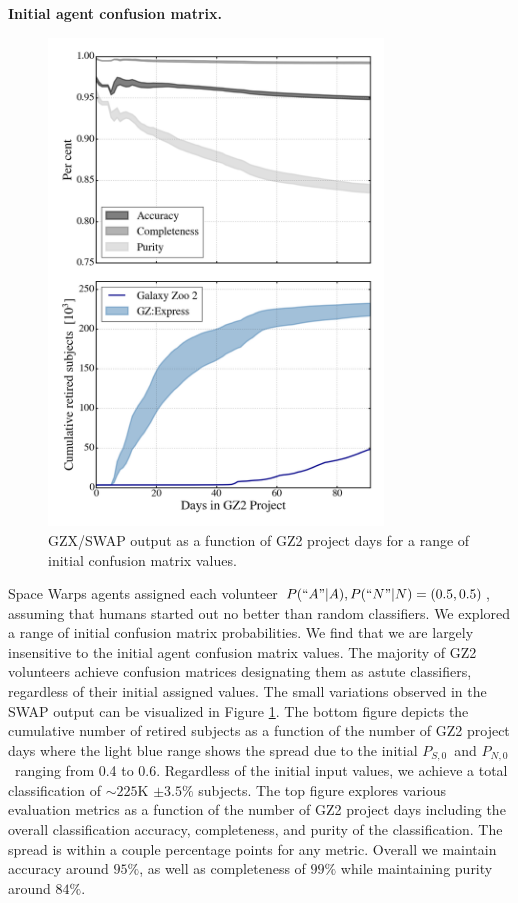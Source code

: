 \documentclass[twocolumn]{aastex6}
\newcommand{\Ps}{$P_{S,0}$}
\newcommand{\Pn}{$P_{N,0}$}
\begin{document}
\textbf{Initial agent confusion matrix.} 
\begin{figure}[t!]
\includegraphics[width=3.5in]{GZX_eval_and_retirement_PLPD_spread_4paper.png}
\caption{GZX/SWAP output as a function of GZ2 project days for a range of initial
confusion matrix values.  \label{fig: confusionMatrixAnalysis}}
\end{figure}
Space Warps agents assigned each volunteer $P(``A"|A), P(``N"|N) = (0.5, 0.5)$, 
assuming that humans started out no better than random classifiers.  We explored a range
of initial confusion matrix probabilities. We find that we are largely insensitive to the 
initial agent confusion matrix values.  The majority of GZ2 volunteers achieve confusion
matrices designating them as astute classifiers, regardless of their initial assigned values. 
The  small variations observed in the SWAP output can be visualized in 
Figure \ref{fig: confusionMatrixAnalysis}. The bottom figure depicts the cumulative 
number of retired subjects as a function of the number of GZ2 project days where the light blue range 
shows the spread due to the initial \Ps~and \Pn~ranging from 0.4 to 0.6. 
Regardless of the initial input values, we achieve a total classification of $\sim225$K  $\pm 3.5\%$ subjects. 
The top figure explores various evaluation metrics as a function of the number of 
GZ2 project days including the overall classification accuracy, completeness, and 
purity of the classification. The spread is within a couple percentage points for any
metric. Overall we maintain accuracy around $95\%$, as well as completeness of $99\%$
while maintaining purity around $84\%$. 
\end{document}
